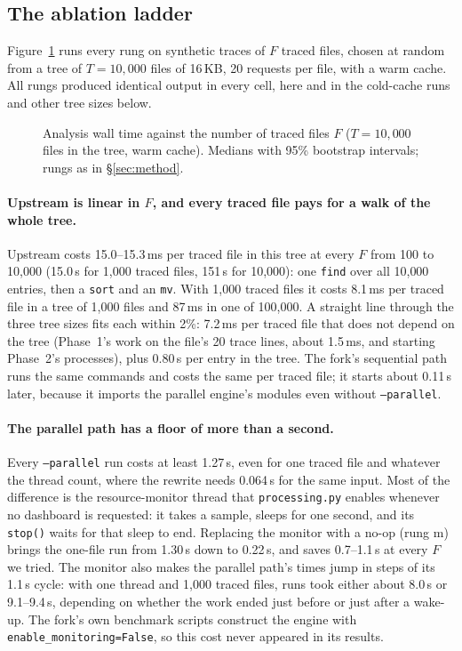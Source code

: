 \subsection{The ablation ladder}
\label{sec:ladder}

Figure~\ref{fig:ladder} runs every rung on synthetic traces of $F$ traced files, chosen
at random from a tree of $T = 10{,}000$ files of 16\,KB, 20 requests per file, with a
warm cache. All rungs produced identical output in every cell, here and in the
cold-cache runs and other tree sizes below.

\begin{figure}[t]
\centering
{}
\caption{Analysis wall time against the number of traced files $F$ ($T = 10{,}000$ files
in the tree, warm cache). Medians with 95\% bootstrap intervals; rungs as in
\S\ref{sec:method}.}
\label{fig:ladder}
\end{figure}

\paragraph{Upstream is linear in $F$, and every traced file pays for a walk of the
whole tree.} Upstream costs 15.0--15.3\,ms per traced file in this tree at every $F$
from 100 to 10{,}000 (15.0\,s for 1{,}000 traced files, 151\,s for 10{,}000): one
\texttt{find} over all 10{,}000 entries, then a \texttt{sort} and an \texttt{mv}. With
1{,}000 traced files it costs 8.1\,ms per traced file in a tree of 1{,}000 files and
87\,ms in one of 100{,}000. A straight line through the three tree sizes fits each
within 2\%: 7.2\,ms per traced file that does not depend on the tree (Phase~1's work
on the file's 20 trace lines, about 1.5\,ms, and starting Phase~2's processes), plus
0.80\,\textmu s per entry in the tree. The fork's sequential path runs the same commands
and costs the same per traced file; it starts about 0.11\,s later, because it imports
the parallel engine's modules even without \texttt{--parallel}.

\paragraph{The parallel path has a floor of more than a second.} Every
\texttt{--parallel} run costs at least 1.27\,s, even for one traced file and whatever
the thread count, where the rewrite needs 0.064\,s for the same input. Most of the
difference is the resource-monitor thread that \texttt{processing.py} enables whenever
no dashboard is requested: it takes a sample, sleeps for one second, and its
\texttt{stop()} waits for that sleep to end. Replacing the monitor with a no-op (rung m)
brings the one-file run from 1.30\,s down to 0.22\,s, and saves 0.7--1.1\,s at every $F$
we tried. The monitor also makes the parallel path's times jump in steps of its
1.1\,s cycle: with one thread and 1{,}000 traced files, runs took either about 8.0\,s or
9.1--9.4\,s, depending on whether the work ended just before or just after a wake-up.
The fork's own benchmark scripts
construct the engine with \texttt{enable\_monitoring=False}, so this cost never
appeared in its results.

